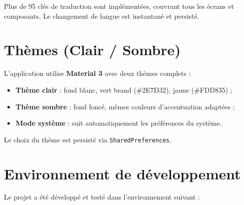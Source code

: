 \documentclass[12pt,a4paper]{report}
\begin{document}
Plus de 95 clés de traduction sont implémentées, couvrant tous les écrans et composants. Le changement de langue est instantané et persisté.

\section{Thèmes (Clair / Sombre)}

L'application utilise \textbf{Material 3} avec deux thèmes complets :
\begin{itemize}
    \item \textbf{Thème clair} : fond blanc, vert brand (\#2E7D32), jaune (\#FDD835) ;
    \item \textbf{Thème sombre} : fond foncé, mêmes couleurs d'accentuation adaptées ;
    \item \textbf{Mode système} : suit automatiquement les préférences du système.
\end{itemize}

Le choix du thème est persisté via \texttt{SharedPreferences}.

\section{Environnement de développement}

Le projet a été développé et testé dans l'environnement suivant :
\end{document}
